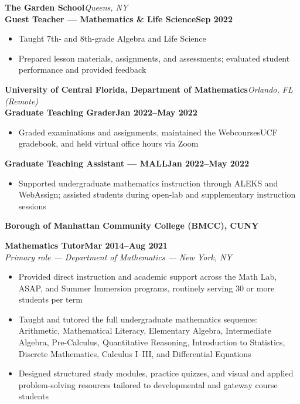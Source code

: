 \documentclass[a4paper, 11pt]{article}
\newcommand{\entryvspace}{\vspace{9pt}}
\newcommand{\workplace}[1]{%
  \noindent\textbf{#1}\par\vspace{2pt}%
}
\newcommand{\workrole}[3]{%
  \noindent\hspace*{1em}\textbf{#1}\hfill\textbf{#2}\\
  \hspace*{1em}\textit{#3}\par
}
\newcommand{\singlework}[4]{%
  \noindent\textbf{#1}\hfill\textit{#2}\\
  \noindent\hspace*{1em}\textbf{#3}\hfill\textbf{#4}\par
}
\newcommand{\nestedrole}[2]{%
  \noindent\hspace*{1em}\textbf{#1}\hfill\textbf{#2}\par
}
\begin{document}
\entryvspace

\singlework{The Garden School}{Queens, NY}%
  {Guest Teacher --- Mathematics \& Life Science}{Sep 2022}
\begin{itemize}
  \item Taught 7th- and 8th-grade Algebra and Life Science
  \item Prepared lesson materials, assignments, and assessments; evaluated student
        performance and provided feedback
\end{itemize}

\entryvspace

\singlework{University of Central Florida, Department of Mathematics}{Orlando, FL (Remote)}%
  {Graduate Teaching Grader}{Jan 2022--May 2022}
\begin{itemize}
  \item Graded examinations and assignments, maintained the WebcoursesUCF gradebook,
        and held virtual office hours via Zoom
\end{itemize}

\vspace{3pt}

\nestedrole{Graduate Teaching Assistant --- MALL}%
  {Jan 2022--May 2022}
\begin{itemize}
  \item Supported undergraduate mathematics instruction through ALEKS and WebAssign;
        assisted students during open-lab and supplementary instruction sessions
\end{itemize}

\entryvspace

\workplace{Borough of Manhattan Community College (BMCC), CUNY}
\workrole{Mathematics Tutor}%
  {Mar 2014--Aug 2021}{Primary role --- Department of Mathematics --- New York, NY}
\begin{itemize}
  \item Provided direct instruction and academic support across the Math Lab, ASAP,
        and Summer Immersion programs, routinely serving 30 or more students per term
  \item Taught and tutored the full undergraduate mathematics sequence: Arithmetic,
        Mathematical Literacy, Elementary Algebra, Intermediate Algebra, Pre-Calculus,
        Quantitative Reasoning, Introduction to Statistics, Discrete Mathematics,
        Calculus I--III, and Differential Equations
  \item Designed structured study modules, practice quizzes, and visual and applied
        problem-solving resources tailored to developmental and gateway course students
\end{itemize}
\end{document}
